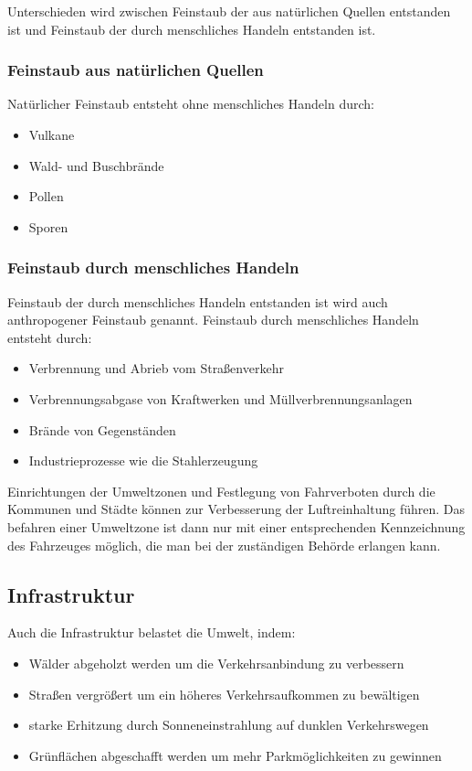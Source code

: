 Unterschieden wird zwischen Feinstaub der aus natürlichen Quellen entstanden ist und Feinstaub der durch menschliches Handeln entstanden ist.

\subsubsection{Feinstaub aus natürlichen Quellen}
Natürlicher Feinstaub entsteht ohne menschliches Handeln durch:
\begin{itemize}
	\item Vulkane
	\item Wald- und Buschbrände
	\item Pollen
	\item Sporen
\end{itemize}


\subsubsection{Feinstaub durch menschliches Handeln}
Feinstaub der durch menschliches Handeln entstanden ist wird auch anthropogener Feinstaub genannt.
Feinstaub durch menschliches Handeln entsteht durch:
\begin{itemize}
	\item Verbrennung und Abrieb vom Straßenverkehr
	\item Verbrennungsabgase von Kraftwerken und Müllverbrennungsanlagen
	\item Brände von Gegenständen
	\item Industrieprozesse wie die Stahlerzeugung
\end{itemize}

Einrichtungen der Umweltzonen und Festlegung von Fahrverboten durch die Kommunen und Städte können zur Verbesserung der Luftreinhaltung führen.
Das befahren einer Umweltzone ist dann nur mit einer entsprechenden Kennzeichnung des Fahrzeuges möglich, die man bei der zuständigen Behörde erlangen kann.



\subsection{Infrastruktur}
Auch die Infrastruktur belastet die Umwelt, indem:
\begin{itemize}
	\item Wälder abgeholzt werden um die Verkehrsanbindung zu verbessern
	\item Straßen vergrößert um ein höheres Verkehrsaufkommen zu bewältigen
	\item starke Erhitzung durch Sonneneinstrahlung auf dunklen Verkehrswegen
	\item Grünflächen abgeschafft werden um mehr Parkmöglichkeiten zu gewinnen
\end{itemize}
